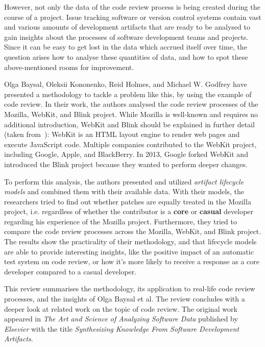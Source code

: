 \documentclass[conference]{IEEEtran}
\begin{document}
However, not only the data of the code review process is being created during the course of a project. Issue tracking software or version control systems contain vast and various amounts of development artifacts that are ready to be analysed to gain insights about the processes of software development teams and projects. Since it can be easy to get lost in the data which accrued itself over time, the question arises how to analyse these quantities of data, and how to spot these above-mentioned rooms for improvement.

Olga Baysal, Oleksii Kononenko, Reid Holmes, and Michael W. Godfrey have presented a methodology to tackle a problem like this, by using the example of code review. In their work, the authors analysed the code review processes of the Mozilla, WebKit, and Blink project. While Mozilla is well-known and requires no additional introduction, WebKit and Blink should be explained in further detail (taken from~\cite{baysal2015synthesizing}): WebKit is an HTML layout engine to render web pages and execute JavaScript code. Multiple companies contributed to the WebKit project, including Google, Apple, and BlackBerry. In 2013, Google forked WebKit and introduced the Blink project because they wanted to perform deeper changes. 

To perform this analysis, the authors presented and utilized \textit{artifact lifecycle models} and combined them with their available data. With their models, the researchers tried to find out whether patches are equally treated in the Mozilla project, i.e. regardless of whether the contributor is a \textbf{core} or \textbf{casual} developer regarding his experience of the Mozilla project. Furthermore, they tried to compare the code review processes across the Mozilla, WebKit, and Blink project. The results show the practicality of their methodology, and that lifecycle models are able to provide interesting insights, like the positive impact of an automatic test system on code review, or how it's more likely to receive a response as a core developer compared to a casual developer.

This review summarises the methodology, its application to real-life code review processes, and the insights of Olga Baysal et al. The review concludes with a deeper look at related work on the topic of code review. The original work appeared in \textit{The Art and Science of Analyzing Software Data} published by \textit{Elsevier} with the title \textit{Synthesizing Knowledge From Software Development Artifacts}.
\end{document}
